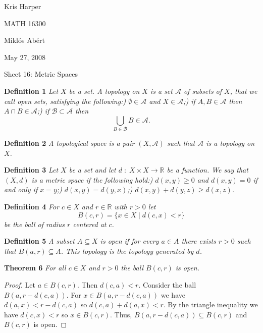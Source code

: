 \documentclass{article}
\begin{document}
\newpage

\begin{flushright}
Kris Harper

MATH 16300

Mikl\'{o}s Ab\'{e}rt

May 27, 2008
\end{flushright}

\begin{flushleft}

\Large

Sheet 16: Metric Spaces\newline

\normalsize

\textbf{Definition 1}
\textsl{Let $X$ be a set. A topology on $X$ is a set $\mathcal{A}$ of subsets of $X$, that we call open sets, satisfying the following:) $\emptyset \in \mathcal{A}$ and $X \in \mathcal{A}$;) if $A, B \in \mathcal{A}$ then $A \cap B \in \mathcal{A}$;) if $\mathcal{B} \subset \mathcal{A}$ then
\[
\bigcup_{B \in \mathcal{B}} B \in \mathcal{A}.
\]}\newline

\textbf{Definition 2}
\textsl{A topological space is a pair $(X, \mathcal{A})$ such that $\mathcal{A}$ is a topology on $X$.}\newline

\textbf{Definition 3}
\textsl{Let $X$ be a set and let $d \; : \; X \times X \rightarrow \mathbb{R}$ be a function. We say that $(X, d)$ is a metric space if the following hold:) $d(x,y) \geq 0$ and $d(x,y) = 0$ if and only if $x=y$;) $d(x,y) = d(y,x)$;) $d(x,y) + d(y,z) \geq d(x,z)$.}\newline

\textbf{Definition 4}
\textsl{For $c \in X$ and $r \in \mathbb{R}$ with $r > 0$ let
\[
B(c,r) = \{x \in X \mid d(c,x) < r\}
\]
be the ball of radius $r$ centered at $c$.}\newline

\textbf{Definition 5}
\textsl{A subset $A \subseteq X$ is open if for every $a \in A$ there exists $r > 0$ such that $B(a,r) \subseteq A$. This topology is the topology generated by $d$.}\newline

\textbf{Theorem 6}
\textsl{For all $c \in X$ and $r > 0$ the ball $B(c,r)$ is open.}
\begin{proof}
Let $a \in B(c,r)$. Then $d(c,a) < r$. Consider the ball $B(a, r-d(c,a))$. For $x \in B(a, r-d(c,a))$ we have $d(a,x) < r - d(c,a)$ so $d(c,a) + d(a,x) < r$. By the triangle inequality we have $d(c,x) < r$ so $x \in B(c,r)$. Thus, $B(a, r-d(c,a)) \subseteq B(c,r)$ and $B(c,r)$ is open.
\end{proof}


\end{flushleft}
\end{document}

